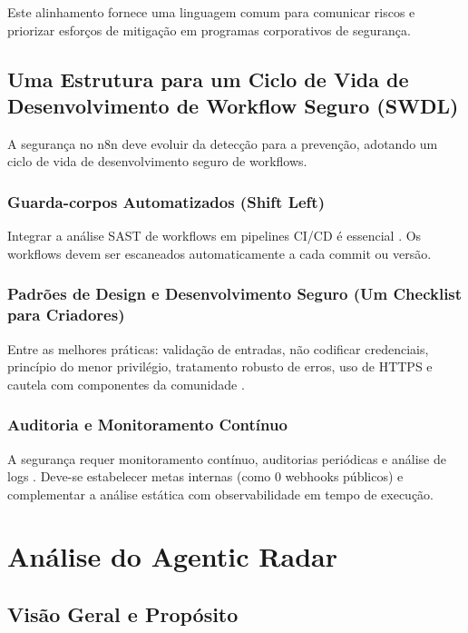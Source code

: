 \documentclass{sftex}
\begin{document}
Este alinhamento fornece uma linguagem comum para comunicar riscos e priorizar esforços de mitigação em programas corporativos de segurança.

\subsection{Uma Estrutura para um Ciclo de Vida de Desenvolvimento de Workflow Seguro (SWDL)}

A segurança no n8n deve evoluir da detecção para a prevenção, adotando um ciclo de vida de desenvolvimento seguro de workflows.

\subsubsection{Guarda-corpos Automatizados (Shift Left)}

Integrar a análise SAST de workflows em pipelines CI/CD é essencial \cite{gitlab_sast}. Os workflows devem ser escaneados automaticamente a cada commit ou versão.

\subsubsection{Padrões de Design e Desenvolvimento Seguro (Um Checklist para Criadores)}

Entre as melhores práticas: validação de entradas, não codificar credenciais, princípio do menor privilégio, tratamento robusto de erros, uso de HTTPS e cautela com componentes da comunidade \cite{n8n_best_practices_reddit}.

\subsubsection{Auditoria e Monitoramento Contínuo}

A segurança requer monitoramento contínuo, auditorias periódicas e análise de logs \cite{owasp_source_code_analysis}. Deve-se estabelecer metas internas (como 0 webhooks públicos) e complementar a análise estática com observabilidade em tempo de execução.

\newpage

\section{Análise do Agentic Radar}

\subsection{Visão Geral e Propósito}
\end{document}
